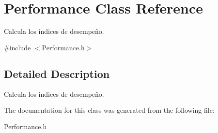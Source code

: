 \hypertarget{classPerformance}{}\section{Performance Class Reference}
\label{classPerformance}


Calcula los indices de desempeño.  




{\ttfamily \#include $<$Performance.\+h$>$}



\subsection{Detailed Description}
Calcula los indices de desempeño. 

The documentation for this class was generated from the following file\+:\begin{DoxyCompactItemize}
\item 
Performance.\+h\end{DoxyCompactItemize}
